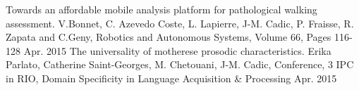 \begin{cventries}
    \cventryEducationMehdi
    {Towards an affordable mobile analysis platform for pathological walking assessment.}
    {V.Bonnet, C. Azevedo Coste, L. Lapierre, J-M. Cadic, P. Fraisse, R. Zapata and C.Geny, Robotics and Autonomous Systems, Volume 66, Pages 116-128}
    {Apr. 2015}
    {}
    {}
    \cventryEducationMehdi
    {The universality of motherese prosodic characteristics.}
    {Erika Parlato, Catherine Saint-Georges, M. Chetouani, J-M. Cadic, Conference, 3 IPC in RIO, Domain Specificity in Language Acquisition \& Processing}
    {Apr. 2015}
    {}
    {}
\end{cventries}
